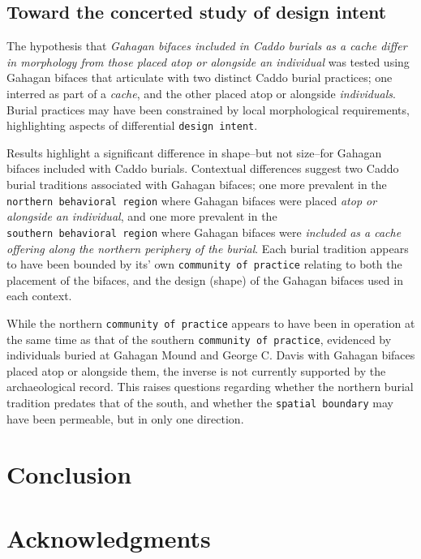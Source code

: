 \documentclass[]{interact}
\theoremstyle{plain}%
\theoremstyle{definition}
\theoremstyle{remark}
\begin{document}
\hypertarget{toward-the-concerted-study-of-design-intent}{%
\subsection{Toward the concerted study of design
intent}\label{toward-the-concerted-study-of-design-intent}}

The hypothesis that \emph{Gahagan bifaces included in Caddo burials as a
cache differ in morphology from those placed atop or alongside an
individual} was tested using Gahagan bifaces that articulate with two
distinct Caddo burial practices; one interred as part of a \emph{cache},
and the other placed atop or alongside \emph{individuals}. Burial
practices may have been constrained by local morphological requirements,
highlighting aspects of differential \texttt{design\ intent}.

Results highlight a significant difference in shape--but not size--for
Gahagan bifaces included with Caddo burials. Contextual differences
suggest two Caddo burial traditions associated with Gahagan bifaces; one
more prevalent in the \texttt{northern\ behavioral\ region} where
Gahagan bifaces were placed \emph{atop or alongside an individual}, and
one more prevalent in the \texttt{southern\ behavioral\ region} where
Gahagan bifaces were \emph{included as a cache offering along the
northern periphery of the burial}. Each burial tradition appears to have
been bounded by its' own \texttt{community\ of\ practice} relating to
both the placement of the bifaces, and the design (shape) of the Gahagan
bifaces used in each context.

While the northern \texttt{community\ of\ practice} appears to have been
in operation at the same time as that of the southern
\texttt{community\ of\ practice}, evidenced by individuals buried at
Gahagan Mound and George C. Davis with Gahagan bifaces placed atop or
alongside them, the inverse is not currently supported by the
archaeological record. This raises questions regarding whether the
northern burial tradition predates that of the south, and whether the
\texttt{spatial\ boundary} may have been permeable, but in only one
direction.

\hypertarget{conclusion}{%
\section{Conclusion}\label{conclusion}}

\hypertarget{acknowledgments}{%
\section*{Acknowledgments}\label{acknowledgments}}
\end{document}
